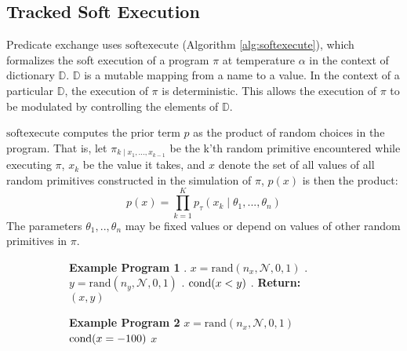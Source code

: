 \subsection{Tracked Soft Execution}
Predicate exchange uses $\textrm{softexecute}$
(Algorithm \ref{alg:softexecute}), which formalizes the soft execution of a program $\pi$  at temperature $\alpha$ in the context of dictionary $\mathbb{D}$.
$\mathbb{D}$ is a mutable mapping from a name to a value.
In the context of a particular $\mathbb{D}$, the execution of $\pi$ is deterministic.
This allows the execution of $\pi$ to be modulated by controlling the elements of $\mathbb{D}$.


$\textrm{softexecute}$ computes the prior term $p$ as the product of random choices in the program. 
That is, let $\pi_{k \mid x_1, ..., x_{k-1}}$ be the k'th random primitive encountered while executing $\pi$, $x_k$ be the value it takes, and $x$ denote the set of all values of all random primitives constructed in the simulation of $\pi$, $p(x)$ is then the product:
\begin{equation}\label{productprob}
p(x) = \prod_{k=1}^K p_\tau(x_k \mid \theta_1,..., \theta_n )
\end{equation}
The parameters $\theta_1,..,\theta_n$ may be fixed values or depend on values of other random primitives in $\pi$.



\begin{figure}[tb]
  \centering
  \begin{subfigure}[t]{4cm}
    \vskip 0pt
      \begin{algorithmic}
      \STATE \textbf{Example Program 1}
      . $x = \textrm{rand}(n_x, \mathcal{N}, 0, 1)$
      . $y = \textrm{rand}(n_y, \mathcal{N}, 0, 1)$
      . $\operatorname{cond}(x < y)$
      . {\bfseries Return:} $(x, y)$
      \end{algorithmic}
  \end{subfigure}%
  \hfill
  \begin{subfigure}[t]{4cm}
    \vskip 0pt
      \begin{algorithmic}
      \STATE \textbf{Example Program 2}
      \STATE $x = \textrm{rand}(n_x, \mathcal{N}, 0, 1)$
      \STATE $\operatorname{cond}(x = -100)$
      \ENDIF
       $x$
      \end{algorithmic}
  \end{subfigure}
\end{figure}


